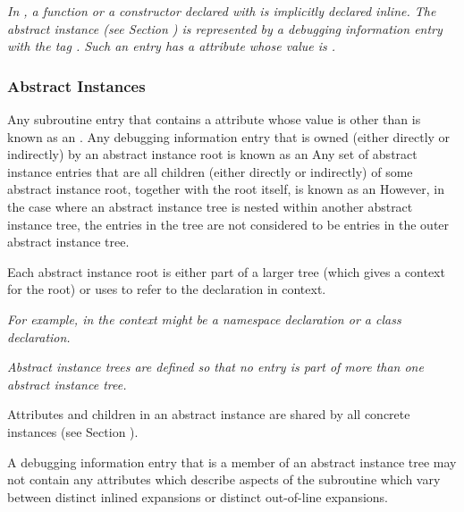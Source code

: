 \textit{In , a function or a constructor declared with
 is implicitly declared inline. The abstract
instance (see Section ) 
is represented by a debugging information
entry with the tag \DWTAGsubprogram. Such an entry has a
\DWATinline{} attribute whose value is \DWINLinlined.}

\subsubsection{Abstract Instances}
\label{chap:abstractinstances}
Any subroutine entry that contains a
\DWATinlineDEFN{} attribute 
whose value is other than 
\DWINLnotinlined{}
is known as an .
\hypertarget{chap:DWATinlineabstracttinstance}{}
Any debugging information entry that is owned (either
directly or indirectly) by an abstract instance root
is known as an 
Any set of abstract instance entries that are all
children (either directly or indirectly) of some abstract
instance root, together with the root itself, is known as an
However, in the case where an abstract instance tree is 
nested within another abstract instance tree, the entries in the 
tree are not considered to be entries in the outer abstract
instance tree.

Each abstract instance root is either part of a larger
tree (which gives a context for the root) or 
uses
\DWATspecification{} 
to refer to the declaration in context.

\textit{For example, in  the context might be a namespace
declaration or a class declaration.}

\textit{Abstract instance trees are defined so that no entry is part
of more than one abstract instance tree.}

Attributes and children in an abstract instance are shared
by all concrete instances (see Section ).

A debugging information entry that is a member of an abstract
instance tree may not contain any attributes which describe
aspects of the subroutine which vary between distinct inlined
expansions or distinct out-of-line expansions. 

